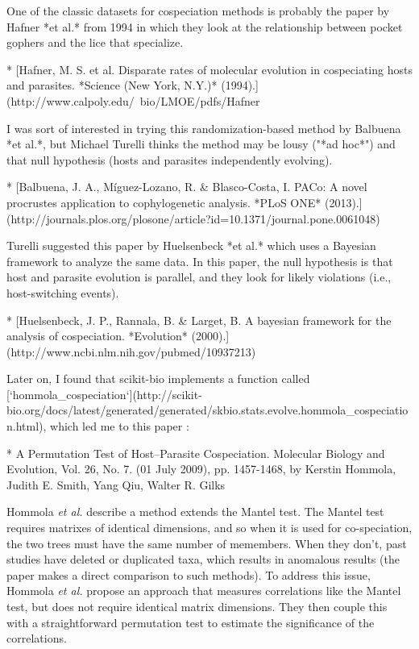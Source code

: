 One of the classic datasets for cospeciation methods is probably the paper by 
Hafner *et al.* from 1994 in which they look at the relationship between pocket
gophers and the lice that specialize. 

* [Hafner, M. S. et al. Disparate rates of molecular evolution in cospeciating hosts and parasites. *Science (New York, N.Y.)* (1994).](http://www.calpoly.edu/~bio/LMOE/pdfs/Hafner%

I was sort of interested in trying this randomization-based method by Balbuena 
*et al.*, but Michael Turelli thinks the method may be lousy ("*ad hoc*") and 
that null hypothesis (hosts and parasites independently evolving).

* [Balbuena, J. A., Míguez-Lozano, R. & Blasco-Costa, I. PACo: A novel procrustes application to cophylogenetic analysis. *PLoS ONE* (2013).](http://journals.plos.org/plosone/article?id=10.1371/journal.pone.0061048)

Turelli suggested this paper by Huelsenbeck *et al.* which uses a Bayesian
framework to analyze the same data. In this paper, the null hypothesis is that
host and parasite evolution is parallel, and they look for likely violations
(i.e., host-switching events).

* [Huelsenbeck, J. P., Rannala, B. & Larget, B. A bayesian framework for the analysis of cospeciation. *Evolution* (2000).](http://www.ncbi.nlm.nih.gov/pubmed/10937213)

Later on, I found that scikit-bio implements a function called [`hommola_cospeciation`](http://scikit-bio.org/docs/latest/generated/generated/skbio.stats.evolve.hommola_cospeciation.html), which led me to this paper :

* A Permutation Test of Host–Parasite Cospeciation. Molecular Biology and Evolution, Vol. 26, No. 7. (01 July 2009), pp. 1457-1468, by Kerstin Hommola, Judith E. Smith, Yang Qiu, Walter R. Gilks

Hommola {\em et al.} describe a method extends the Mantel test. \cite{mantel1967detection} The Mantel test
requires matrixes of identical dimensions, and so when it is used for 
co-speciation, the two trees must have the same number of memembers. When
they don't, past studies have deleted or duplicated taxa, which results in
anomalous results (the paper makes a direct comparison to such methods).
To address this issue, Hommola {\em et al.} \cite{hommola2009permutation} propose an approach that measures
correlations like the Mantel test, but does not require identical matrix
dimensions. They then couple this with a straightforward permutation test 
to estimate the significance of the correlations.

